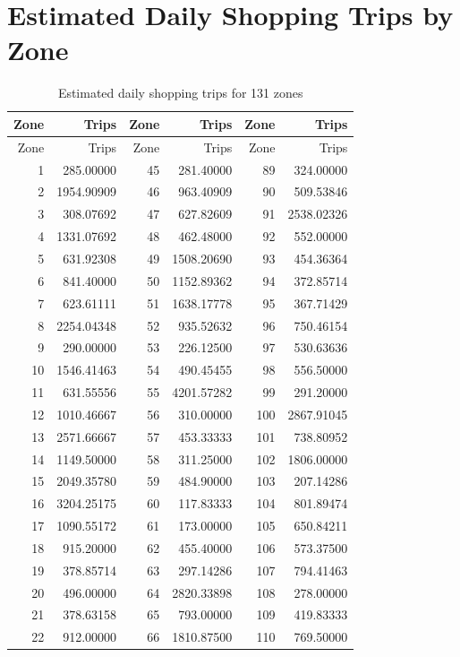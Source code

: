 \documentclass[11pt]{article}
\begin{document}
\section{Estimated Daily Shopping Trips by Zone}\label{app:zones}
\begin{longtable}{r r r r r r}\caption{Estimated daily shopping trips for 131 zones}\\\toprule
Zone & Trips & Zone & Trips & Zone & Trips\\\midrule\endfirsthead
\toprule Zone & Trips & Zone & Trips & Zone & Trips\\\midrule\endhead
1 & 285.00000 & 45 & 281.40000 & 89 & 324.00000\\
2 & 1954.90909 & 46 & 963.40909 & 90 & 509.53846\\
3 & 308.07692 & 47 & 627.82609 & 91 & 2538.02326\\
4 & 1331.07692 & 48 & 462.48000 & 92 & 552.00000\\
5 & 631.92308 & 49 & 1508.20690 & 93 & 454.36364\\
6 & 841.40000 & 50 & 1152.89362 & 94 & 372.85714\\
7 & 623.61111 & 51 & 1638.17778 & 95 & 367.71429\\
8 & 2254.04348 & 52 & 935.52632 & 96 & 750.46154\\
9 & 290.00000 & 53 & 226.12500 & 97 & 530.63636\\
10 & 1546.41463 & 54 & 490.45455 & 98 & 556.50000\\
11 & 631.55556 & 55 & 4201.57282 & 99 & 291.20000\\
12 & 1010.46667 & 56 & 310.00000 & 100 & 2867.91045\\
13 & 2571.66667 & 57 & 453.33333 & 101 & 738.80952\\
14 & 1149.50000 & 58 & 311.25000 & 102 & 1806.00000\\
15 & 2049.35780 & 59 & 484.90000 & 103 & 207.14286\\
16 & 3204.25175 & 60 & 117.83333 & 104 & 801.89474\\
17 & 1090.55172 & 61 & 173.00000 & 105 & 650.84211\\
18 & 915.20000 & 62 & 455.40000 & 106 & 573.37500\\
19 & 378.85714 & 63 & 297.14286 & 107 & 794.41463\\
20 & 496.00000 & 64 & 2820.33898 & 108 & 278.00000\\
21 & 378.63158 & 65 & 793.00000 & 109 & 419.83333\\
22 & 912.00000 & 66 & 1810.87500 & 110 & 769.50000\\

\end{longtable}
\end{document}
